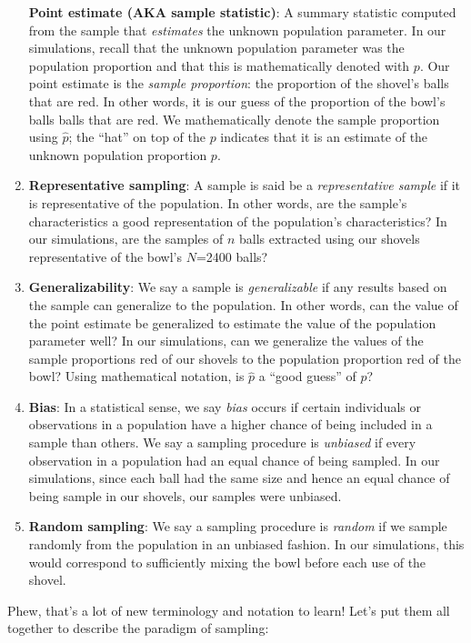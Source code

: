 \documentclass[12pt, krantz2,]{krantz}
\begin{document}
\begin{enumerate}
  \textbf{Point estimate (AKA sample statistic)}: A summary statistic computed from the sample that \emph{estimates} the unknown population parameter. In our simulations, recall that the unknown population parameter was the population proportion and that this is mathematically denoted with \(p\). Our point estimate is the \emph{sample proportion}: the proportion of the shovel's balls that are red. In other words, it is our guess of the proportion of the bowl's balls balls that are red. We mathematically denote the sample proportion using \(\widehat{p}\); the ``hat'' on top of the \(p\) indicates that it is an estimate of the unknown population proportion \(p\).
\item
  \textbf{Representative sampling}: A sample is said be a \emph{representative sample} if it is representative of the population. In other words, are the sample's characteristics a good representation of the population's characteristics? In our simulations, are the samples of \(n\) balls extracted using our shovels representative of the bowl's \(N\)=2400 balls?
\item
  \textbf{Generalizability}: We say a sample is \emph{generalizable} if any results based on the sample can generalize to the population. In other words, can the value of the point estimate be generalized to estimate the value of the population parameter well? In our simulations, can we generalize the values of the sample proportions red of our shovels to the population proportion red of the bowl? Using mathematical notation, is \(\widehat{p}\) a ``good guess'' of \(p\)?
\item
  \textbf{Bias}: In a statistical sense, we say \emph{bias} occurs if certain individuals or observations in a population have a higher chance of being included in a sample than others. We say a sampling procedure is \emph{unbiased} if every observation in a population had an equal chance of being sampled. In our simulations, since each ball had the same size and hence an equal chance of being sample in our shovels, our samples were unbiased.
\item
  \textbf{Random sampling}: We say a sampling procedure is \emph{random} if we sample randomly from the population in an unbiased fashion. In our simulations, this would correspond to sufficiently mixing the bowl before each use of the shovel.
\end{enumerate}

Phew, that's a lot of new terminology and notation to learn! Let's put them all together to describe the paradigm of sampling:
\end{document}
